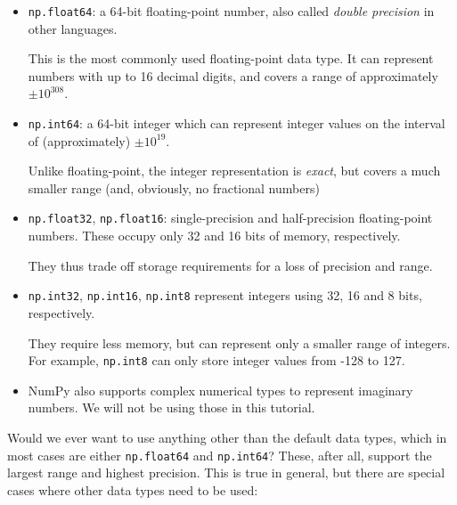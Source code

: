 \documentclass[10pt]{scrartcl}
\begin{document}
\begin{itemize}
\item
  \texttt{np.float64}: a 64-bit floating-point number, also called
  \emph{double precision} in other languages.

  This is the most commonly used floating-point data type. It can
  represent numbers with up to 16 decimal digits, and covers a range of
  approximately \(\pm 10^{308}\).
\item
  \texttt{np.int64}: a 64-bit integer which can represent integer values
  on the interval of (approximately) \(\pm10^{19}\).

  Unlike floating-point, the integer representation is \emph{exact}, but
  covers a much smaller range (and, obviously, no fractional numbers)
\item
  \texttt{np.float32}, \texttt{np.float16}: single-precision and
  half-precision floating-point numbers. These occupy only 32 and 16
  bits of memory, respectively.

  They thus trade off storage requirements for a loss of precision and
  range.
\item
  \texttt{np.int32}, \texttt{np.int16}, \texttt{np.int8} represent
  integers using 32, 16 and 8 bits, respectively.

  They require less memory, but can represent only a smaller range of
  integers. For example, \texttt{np.int8} can only store integer values
  from -128 to 127.
\item
  NumPy also supports complex numerical types to represent imaginary
  numbers. We will not be using those in this tutorial.
\end{itemize}

Would we ever want to use anything other than the default data types,
which in most cases are either \texttt{np.float64} and
\texttt{np.int64}? These, after all, support the largest range and
highest precision. This is true in general, but there are special cases
where other data types need to be used:
\end{document}
